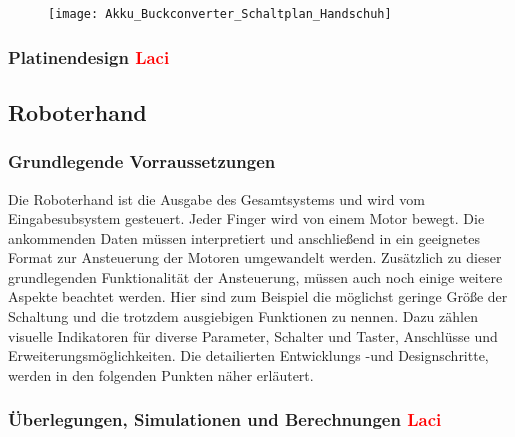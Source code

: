 \documentclass[titlepage,12pt,twoside]{article}
\begin{document}
\begin{figure}[H]
	\begin{center}
		\scalebox{0.5}
		{\texttt{[image: Akku\_Buckconverter\_Schaltplan\_Handschuh]}}
	\end{center}
\end{figure}

\subsubsection{Platinendesign \textcolor{red}{Laci}}

\subsection{Roboterhand}

\subsubsection{Grundlegende Vorraussetzungen}
Die Roboterhand ist die Ausgabe des Gesamtsystems und wird vom Eingabesubsystem gesteuert. Jeder Finger wird von einem Motor 
bewegt. Die ankommenden Daten müssen interpretiert und anschließend in ein geeignetes Format zur Ansteuerung der Motoren
umgewandelt werden. Zusätzlich zu dieser grundlegenden Funktionalität der Ansteuerung, müssen auch noch einige weitere Aspekte
beachtet werden. Hier sind zum Beispiel die möglichst geringe Größe der Schaltung und die trotzdem ausgiebigen Funktionen 
zu nennen. Dazu zählen visuelle Indikatoren für diverse Parameter, Schalter und Taster, Anschlüsse und Erweiterungsmöglichkeiten.
Die detailierten Entwicklungs -und Designschritte, werden in den folgenden Punkten näher erläutert. \\

\subsubsection{Überlegungen, Simulationen und Berechnungen \textcolor{red}{Laci}}
\end{document}
